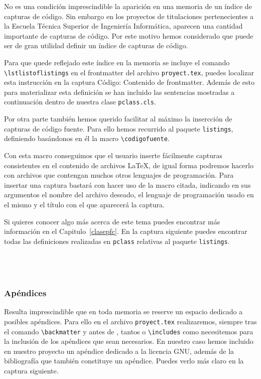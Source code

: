 No es una condici\'on imprescindible la aparici\'on en una memoria de un \'indice de capturas de c\'odigo. Sin embargo
en los proyectos de titulaciones pertenecientes a la Escuela T\'ecnica Superior de Ingenier\'ia Inform\'atica, aparecen 
una cantidad importante de capturas de c\'odigo. Por este motivo hemos considerado que puede ser de gran 
utilidad definir un \'indice de capturas de c\'odigo. 

Para que quede reflejado este \'indice en la memoria se incluye el comando \verb+\lstlistoflistings+ en el frontmatter 
del archivo \texttt{proyect.tex}, puedes localizar esta instrucci\'on en la captura C\'odigo: Contenido de frontmatter.
Adem\'as de esto para materializar esta definici\'on se han incluido las sentencias mostradas a continuaci\'on dentro de nuestra clase \texttt{pclass.cls}.


Por otra parte tambi\'en hemos querido facilitar al m\'aximo la insercci\'on de capturas de c\'odigo fuente. Para ello
hemos recurrido al paquete \texttt{listings}, definiendo bas\'andonos en \'el la macro \verb+\codigofuente+. 

Con esta macro conseguimos que el usuario inserte f\'acilmente capturas consistentes en el contenido  de archivos \LaTeX{},
de igual forma podremos hacerlo con archivos que contengan muchos otros lenguajes de programaci\'on. Para insertar una captura bastar\'a con hacer uso de la macro citada, indicando en sus argumentos el nombre del archivo deseado, el 
lenguaje de programaci\'on usado en el mismo y el t\'itulo con el que aparecer\'a la captura.
 
Si quieres conocer algo m\'as acerca de este tema puedes encontrar m\'as informaci\'on en el Capitulo~\ref{clasepfc}. 
En la captura siguiente puedes encontrar todas las definiciones realizadas en \texttt{pclass} relativas al
paquete \texttt{listings}.
\\
\\
\\
\\



\subsubsection{Ap\'endices}
Resulta imprescindible que en toda memoria se reserve un espacio dedicado a posibles ap\'endices. Para ello
en el archivo \texttt{proyect.tex} realizaremos, siempre tras el comando \verb+\backmatter+ y antes de
\verb++, tantos \verb++ o \verb+\includes+ como necesitemos para la inclusi\'on de los
ap\'endices que sean necesarios. En nuestro caso hemos incluido en nuestro proyecto un ap\'endice dedicado a la licencia
GNU, adem\'as de la bibliograf\'ia que tambi\'en constituye un ap\'endice. Puedes verlo m\'as claro en la captura 
siguiente.

